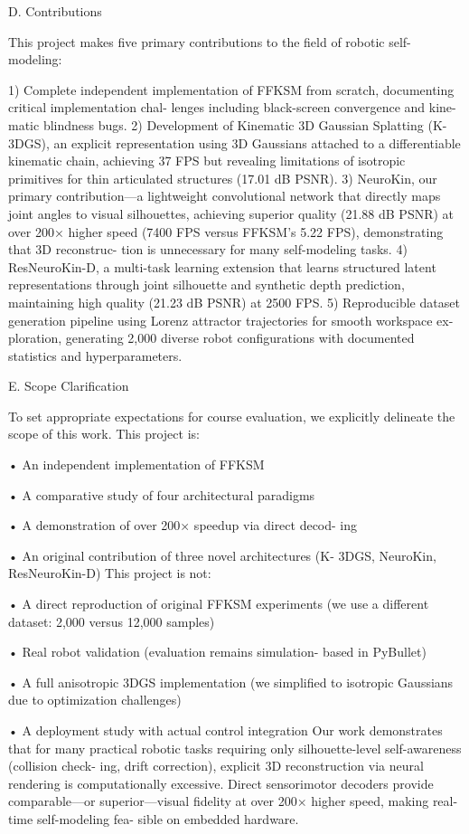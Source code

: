 \documentclass[10pt,twocolumn,letterpaper]{article}
\begin{document}
D. Contributions

This project makes five primary contributions to the field of robotic self-modeling:

1) Complete independent implementation of FFKSM from scratch, documenting critical implementation chal- lenges including black-screen convergence and kine- matic blindness bugs. 2) Development of Kinematic 3D Gaussian Splatting (K- 3DGS), an explicit representation using 3D Gaussians attached to a differentiable kinematic chain, achieving 37 FPS but revealing limitations of isotropic primitives for thin articulated structures (17.01 dB PSNR). 3) NeuroKin, our primary contribution—a lightweight convolutional network that directly maps joint angles to visual silhouettes, achieving superior quality (21.88 dB PSNR) at over 200× higher speed (7400 FPS versus FFKSM’s 5.22 FPS), demonstrating that 3D reconstruc- tion is unnecessary for many self-modeling tasks. 4) ResNeuroKin-D, a multi-task learning extension that learns structured latent representations through joint silhouette and synthetic depth prediction, maintaining high quality (21.23 dB PSNR) at 2500 FPS. 5) Reproducible dataset generation pipeline using Lorenz attractor trajectories for smooth workspace ex- ploration, generating 2,000 diverse robot configurations with documented statistics and hyperparameters.

E. Scope Clarification

To set appropriate expectations for course evaluation, we explicitly delineate the scope of this work. This project is:

• An independent implementation of FFKSM

• A comparative study of four architectural paradigms

• A demonstration of over 200× speedup via direct decod- ing

• An original contribution of three novel architectures (K- 3DGS, NeuroKin, ResNeuroKin-D) This project is not:

• A direct reproduction of original FFKSM experiments (we use a different dataset: 2,000 versus 12,000 samples)

• Real robot validation (evaluation remains simulation- based in PyBullet)

• A full anisotropic 3DGS implementation (we simplified to isotropic Gaussians due to optimization challenges)

• A deployment study with actual control integration Our work demonstrates that for many practical robotic tasks requiring only silhouette-level self-awareness (collision check- ing, drift correction), explicit 3D reconstruction via neural rendering is computationally excessive. Direct sensorimotor decoders provide comparable—or superior—visual fidelity at over 200× higher speed, making real-time self-modeling fea- sible on embedded hardware.
\end{document}

